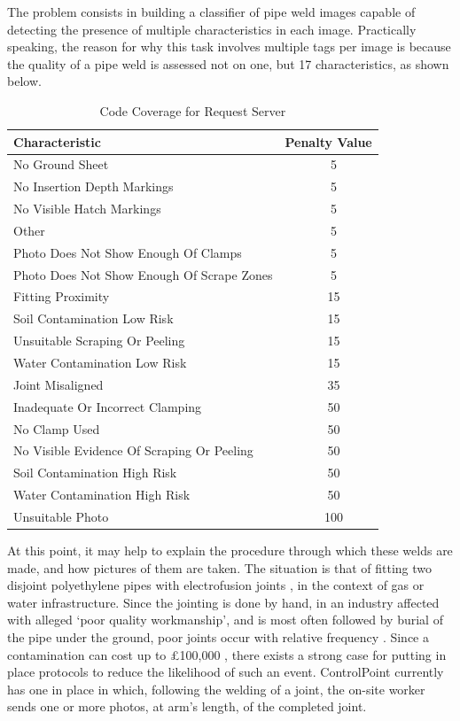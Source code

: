 \documentclass[a4paper,11pt]{article}
\begin{document}
The problem consists in building a classifier of pipe weld images capable of detecting the presence of multiple characteristics in each image. Practically speaking, the reason for why this task involves multiple tags per image is because the quality of a pipe weld is assessed not on one, but 17 characteristics, as shown below.

\begin{table}[h]
   \centering
    \begin{tabular}{|l|c|}
    \hline
    Characteristic                 & Penalty Value  \\ \hline
    No Ground Sheet  & ~  5 \\
    No Insertion Depth Markings  & ~ 5 \\
    No Visible Hatch Markings  & ~ 5 \\
    Other  & ~  5 \\
    Photo Does Not Show Enough Of Clamps  & ~ 5 \\
    Photo Does Not Show Enough Of Scrape Zones  & ~ 5 \\
    Fitting Proximity  & ~  15 \\
    Soil Contamination Low Risk  & ~ 15 \\
    Unsuitable Scraping Or Peeling  & ~ 15 \\
    Water Contamination Low Risk  & ~ 15 \\
    Joint Misaligned  & ~  35 \\
    Inadequate Or Incorrect Clamping  & ~ 50 \\
    No Clamp Used  & ~  50 \\
    No Visible Evidence Of Scraping Or Peeling  & ~ 50 \\
    Soil Contamination High Risk  & ~ 50 \\
    Water Contamination High Risk  & ~ 50 \\
    Unsuitable Photo  & ~ 100 \\
    \hline
    \end{tabular}
    \caption {Code Coverage for Request Server}
\end{table} 

At this point, it may help to explain the procedure through which these welds are made, and how pictures of them are taken. The situation is that of fitting two disjoint polyethylene pipes with electrofusion joints \cite{control-point}, in the context of gas or water infrastructure. Since the jointing is done by hand, in an industry affected with alleged `poor quality workmanship', and is most often followed by burial of the pipe under the ground, poor joints occur with relative frequency \cite{control-point}. Since a contamination can cost up to £100,000 \cite{control-point}, there exists a strong case for putting in place protocols to reduce the likelihood of such an event. ControlPoint currently has one in place in which, following the welding of a joint, the on-site worker sends one or more photos, at arm's length, of the completed joint. \\
\end{document}
